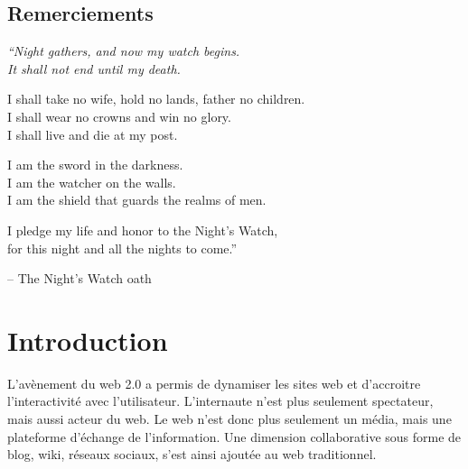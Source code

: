 \documentclass{tnreport}
\begin{document}
  
\maketitle
{}


\cleardoublepage

\makesecondtitle

\section*{Remerciements}

{\em
``Night gathers, and now my watch begins. \\
It shall not end until my death.

I shall take no wife, hold no lands, father no children. \\
I shall wear no crowns and win no glory. \\
I shall live and die at my post.

I am the sword in the darkness. \\
I am the watcher on the walls. \\
I am the shield that guards the realms of men.

I pledge my life and honor to the Night's Watch, \\
for this night and all the nights to come.''
}

\hspace{4cm} -- The Night's Watch oath
\cleardoublepage

\renewcommand{\baselinestretch}{0.5}\normalsize
\tableofcontents
\renewcommand{\baselinestretch}{1.0}\normalsize
\cleardoublepage

\setcounter{page}{1}

\chapter{Introduction}

L'avènement du web 2.0 a permis de dynamiser les sites web et d'accroitre l'interactivité avec l'utilisateur. L'internaute n'est plus 
seulement spectateur, mais aussi acteur du web. Le web n'est donc plus seulement un média, mais une plateforme d'échange de 
l'information. Une dimension collaborative sous forme de blog, wiki, réseaux sociaux, s'est ainsi ajoutée au web traditionnel. 
\end{document}
